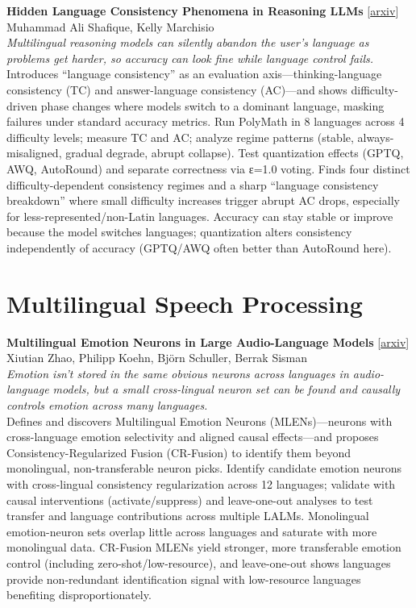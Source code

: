 \documentclass[12pt,letterpaper]{article}
\begin{document}
\medskip

{\small\textbf{Hidden Language Consistency Phenomena in Reasoning LLMs}} {\scriptsize[\href{https://arxiv.org/abs/2608.08447}{arxiv}]}\\
{\scriptsize Muhammad Ali Shafique, Kelly Marchisio}\\

{\small\textit{Multilingual reasoning models can silently abandon the user's language as problems get harder, so accuracy can look fine while language control fails.}}\\[1pt]
{\footnotesize Introduces ``language consistency'' as an evaluation axis---thinking-language consistency (TC) and answer-language consistency (AC)---and shows difficulty-driven phase changes where models switch to a dominant language, masking failures under standard accuracy metrics. Run PolyMath in 8 languages across 4 difficulty levels; measure TC and AC; analyze regime patterns (stable, always-misaligned, gradual degrade, abrupt collapse). Test quantization effects (GPTQ, AWQ, AutoRound) and separate correctness via ε=1.0 voting. Finds four distinct difficulty-dependent consistency regimes and a sharp ``language consistency breakdown'' where small difficulty increases trigger abrupt AC drops, especially for less-represented/non-Latin languages. Accuracy can stay stable or improve because the model switches languages; quantization alters consistency independently of accuracy (GPTQ/AWQ often better than AutoRound here).}

\medskip


\section*{Multilingual Speech Processing}

{\small\textbf{Multilingual Emotion Neurons in Large Audio-Language Models}} {\scriptsize[\href{https://arxiv.org/abs/2608.08772}{arxiv}]}\\
{\scriptsize Xiutian Zhao, Philipp Koehn, Bj\"orn Schuller, Berrak Sisman}\\

{\small\textit{Emotion isn't stored in the same obvious neurons across languages in audio-language models, but a small cross-lingual neuron set can be found and causally controls emotion across many languages.}}\\[1pt]
{\footnotesize Defines and discovers Multilingual Emotion Neurons (MLENs)---neurons with cross-language emotion selectivity and aligned causal effects---and proposes Consistency-Regularized Fusion (CR-Fusion) to identify them beyond monolingual, non-transferable neuron picks. Identify candidate emotion neurons with cross-lingual consistency regularization across 12 languages; validate with causal interventions (activate/suppress) and leave-one-out analyses to test transfer and language contributions across multiple LALMs. Monolingual emotion-neuron sets overlap little across languages and saturate with more monolingual data. CR-Fusion MLENs yield stronger, more transferable emotion control (including zero-shot/low-resource), and leave-one-out shows languages provide non-redundant identification signal with low-resource languages benefiting disproportionately.}
\end{document}
